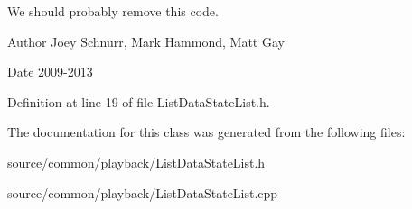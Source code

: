 We should probably remove this code. \begin{DoxyAuthor}{Author}
Joey Schnurr, Mark Hammond, Matt Gay 
\end{DoxyAuthor}
\begin{DoxyDate}{Date}
2009-\/2013 
\end{DoxyDate}


Definition at line 19 of file List\-Data\-State\-List.\-h.



The documentation for this class was generated from the following files\-:\begin{DoxyCompactItemize}
\item 
source/common/playback/List\-Data\-State\-List.\-h\item 
source/common/playback/List\-Data\-State\-List.\-cpp\end{DoxyCompactItemize}
